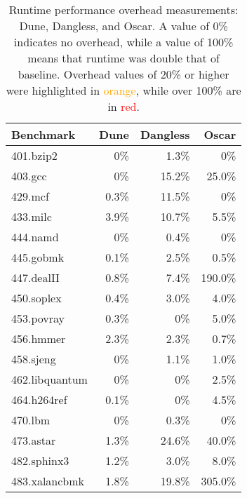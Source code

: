 \begin{table}[]
	\centering
	\begin{tabular}{|l|r|r|r|}
		\hline
		\textbf{Benchmark} & \textbf{Dune} & \textbf{Dangless} & \textbf{Oscar} \\ \hline
		401.bzip2          & 0\%         & 1.3\%             & 0\%                      \\ \hline
		403.gcc            & 0\%         & 15.2\%             & {\color{orange} 25.0\%}                      \\ \hline
		429.mcf            & 0.3\%         & 11.5\%             & 0\%                      \\ \hline
		433.milc           & 3.9\%         & 10.7\%             & 5.5\%                      \\ \hline
		444.namd           & 0\%         & 0.4\%             & 0\%                      \\ \hline
		445.gobmk          & 0.1\%         & 2.5\%             & 0.5\%                      \\ \hline
		447.dealII         & 0.8\%         & 7.4\%             & {\color{red} 190.0\%}                      \\ \hline
		450.soplex         & 0.4\%         & 3.0\%             & 4.0\%                      \\ \hline
		453.povray         & 0.3\%         & 0\%             & 5.0\%                      \\ \hline
		456.hmmer          & 2.3\%         & 2.3\%             & 0.7\%                      \\ \hline
		458.sjeng          & 0\%         & 1.1\%             & 1.0\%                      \\ \hline
		462.libquantum     & 0\%         & 0\%             & 2.5\%                      \\ \hline
		464.h264ref        & 0.1\%         & 0\%             & 4.5\%                      \\ \hline
		470.lbm            & 0\%         & 0.3\%             & 0\%                      \\ \hline
		473.astar          & 1.3\%         & {\color{orange} 24.6\%}             & {\color{orange} 40.0\%}                      \\ \hline
		482.sphinx3        & 1.2\%         & 3.0\%             & 8.0\%                      \\ \hline
		483.xalancbmk      & 1.8\%         & {\color{orange} 19.8\%}             & {\color{red} 305.0\%}                      \\ \hline
	\end{tabular}
	\caption{Runtime performance overhead measurements: Dune, Dangless, and Oscar. A value of 0\% indicates no overhead, while a value of 100\% means that runtime was double that of baseline. Overhead values of 20\% or higher were highlighted in \textcolor{orange}{orange}, while over 100\% are in \textcolor{red}{red}.}
	\label{tab:perf-dune-dangless-oscar}
\end{table}

